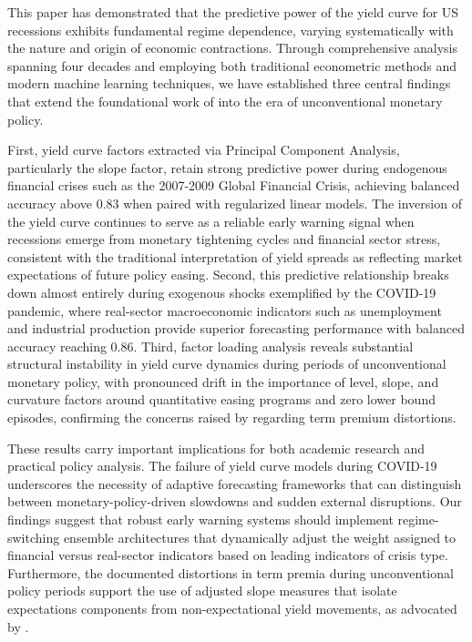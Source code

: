 This paper has demonstrated that the predictive power of the yield curve for US recessions exhibits fundamental regime dependence, varying systematically with the nature and origin of economic contractions. Through comprehensive analysis spanning four decades and employing both traditional econometric methods and modern machine learning techniques, we have established three central findings that extend the foundational work of \citet{estrellaYieldCurvePredictor1996} into the era of unconventional monetary policy.

First, yield curve factors extracted via Principal Component Analysis, particularly the slope factor, retain strong predictive power during endogenous financial crises such as the 2007-2009 Global Financial Crisis, achieving balanced accuracy above 0.83 when paired with regularized linear models. The inversion of the yield curve continues to serve as a reliable early warning signal when recessions emerge from monetary tightening cycles and financial sector stress, consistent with the traditional interpretation of yield spreads as reflecting market expectations of future policy easing. Second, this predictive relationship breaks down almost entirely during exogenous shocks exemplified by the COVID-19 pandemic, where real-sector macroeconomic indicators such as unemployment and industrial production provide superior forecasting performance with balanced accuracy reaching 0.86. Third, factor loading analysis reveals substantial structural instability in yield curve dynamics during periods of unconventional monetary policy, with pronounced drift in the importance of level, slope, and curvature factors around quantitative easing programs and zero lower bound episodes, confirming the concerns raised by \citet{rudebusch2006macroeconomic} regarding term premium distortions.

These results carry important implications for both academic research and practical policy analysis. The failure of yield curve models during COVID-19 underscores the necessity of adaptive forecasting frameworks that can distinguish between monetary-policy-driven slowdowns and sudden external disruptions. Our findings suggest that robust early warning systems should implement regime-switching ensemble architectures that dynamically adjust the weight assigned to financial versus real-sector indicators based on leading indicators of crisis type. Furthermore, the documented distortions in term premia during unconventional policy periods support the use of adjusted slope measures that isolate expectations components from non-expectational yield movements, as advocated by \citet{sharpeNearTermForwardYield2018}.

